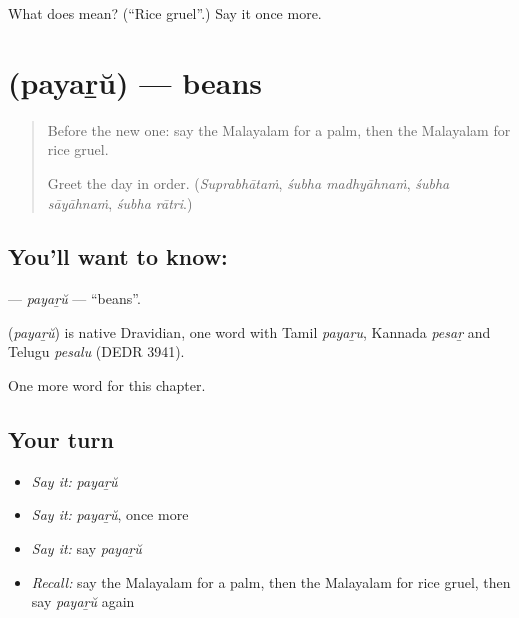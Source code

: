 \begin{tcolorbox}[breakable,colback=teal!4,colframe=teal!35!black,title={Before you move on}]
What does  mean? (\textquotedblleft{}Rice gruel\textquotedblright{}.) Say it once more.
\end{tcolorbox}
\section[\texorpdfstring{\ml{പയറ്} (payaṟŭ)}{പയറ് (payaṟŭ)}]{ (payaṟŭ) — beans}

\label{lesson:ML-C163-payaru}



\begin{quote}
Before the new one: say the Malayalam for a palm, then the Malayalam for rice gruel.

Greet the day in order. (\emph{Suprabhātaṁ}, \emph{śubha madhyāhnaṁ}, \emph{śubha sāyāhnaṁ}, \emph{śubha rātri}.)
\end{quote}

\subsection*{You'll want to know: }
\textbf{} — \emph{payaṟŭ} — \textquotedblleft{}beans\textquotedblright{}.

\begin{cousinweb}
\textbf{} (\emph{payaṟŭ}) is native Dravidian, one word with Tamil \emph{payaṟu}, Kannada \emph{pesaṟ} and Telugu \emph{pesalu} (DEDR 3941).
\end{cousinweb}

\begin{grammarlens}[title={What you've built}]
One more word for this chapter.
\end{grammarlens}

\subsection*{Your turn}
\begin{itemize}
\raggedright
  \item \emph{Say it:} \emph{payaṟŭ}
  \item \emph{Say it:} \emph{payaṟŭ}, once more
  \item \emph{Say it:} say \emph{payaṟŭ}
  \item \emph{Recall:} say the Malayalam for a palm, then the Malayalam for rice gruel, then say \emph{payaṟŭ} again
\end{itemize}

